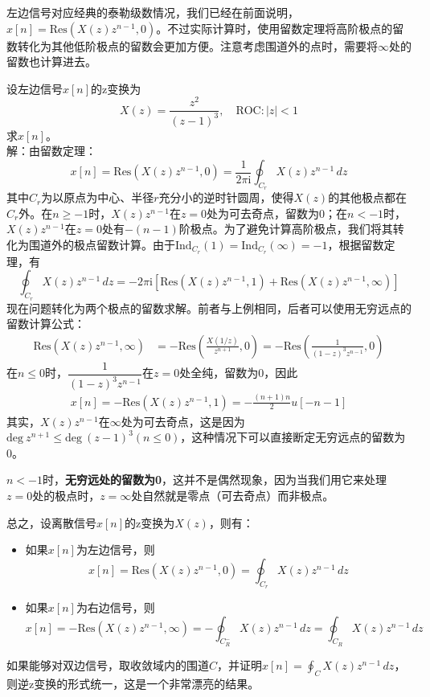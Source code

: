 左边信号对应经典的泰勒级数情况，我们已经在前面说明，$x[n]=\mathrm{Res}\left(X(z)z^{n-1},0\right)$。不过实际计算时，使用留数定理将高阶极点的留数转化为其他低阶极点的留数会更加方便。注意考虑围道外的点时，需要将$\infty$处的留数也计算进去。
\begin{example}
    设左边信号$x[n]$的z变换为
    \[X(z)=\frac{z^2}{(z-1)^3},\quad \mathrm{ROC}:|z|<1\]
    求$x[n]$。\\
    解：由留数定理：
    \[x[n]=\mathrm{Res}\left(X(z)z^{n-1},0\right)=\frac{1}{2\pi \mathrm{i}}\oint_{C_r}X(z)z^{n-1}\,dz\]
    其中$C_r$为以原点为中心、半径$r$充分小的逆时针圆周，使得$X(z)$的其他极点都在$C_r$外。在$n\geq -1$时，$X(z)z^{n-1}$在$z=0$处为可去奇点，留数为0；在$n<-1$时，$X(z)z^{n-1}$在$z=0$处有$-(n-1)$阶极点。为了避免计算高阶极点，我们将其转化为围道外的极点留数计算。由于$\mathrm{Ind}_{C_r}(1)=\mathrm{Ind}_{C_r}(\infty)=-1$，根据留数定理，有
    \[\oint_{C_r}X(z)z^{n-1}\,dz=-2\pi \mathrm{i} \left[\mathrm{Res}\left(X(z)z^{n-1},1\right)+\mathrm{Res}\left(X(z)z^{n-1},\infty\right)\right]\]
    现在问题转化为两个极点的留数求解。前者与上例相同，后者可以使用无穷远点的留数计算公式：
    \begin{align*}
        \mathrm{Res}\left(X(z)z^{n-1},\infty\right)&=-\mathrm{Res}\left(\frac{X(1/z)}{z^{n+1}},0\right)=-\mathrm{Res}\left(\frac{1}{(1-z)^3 z^{n-1}},0\right)
    \end{align*}
    在$n\le 0$时，$\dfrac{1}{(1-z)^3 z^{n-1}}$在$z=0$处全纯，留数为0，因此
    \begin{align*}
        x[n]=-\mathrm{Res}\left(X(z)z^{n-1},1\right)=-\frac{(n+1)n}{2}u[-n-1]
    \end{align*}
    其实，$X(z)z^{n-1}$在$\infty$处为可去奇点，这是因为$\mathrm{deg}\ z^{n+1}\leq \mathrm{deg}\ (z-1)^3(n\le 0)$，这种情况下可以直接断定无穷远点的留数为0。
\end{example}

$n<-1$时，\textbf{无穷远处的留数为0}，这并不是偶然现象，因为当我们用它来处理$z=0$处的极点时，$z=\infty$处自然就是零点（可去奇点）而非极点。

总之，设离散信号$x[n]$的z变换为$X(z)$，则有：
\begin{itemize}
    \item 如果$x[n]$为左边信号，则
    \[x[n]=\mathrm{Res}\left(X(z)z^{n-1},0\right)=\oint_{C_r}X(z)z^{n-1}\,dz\]
    \item 如果$x[n]$为右边信号，则
    \[x[n]=-\mathrm{Res}\left(X(z)z^{n-1},\infty\right)=-\oint_{C^-_R}X(z)z^{n-1}\,dz=\oint_{C_R}X(z)z^{n-1}\,dz\]
\end{itemize}
如果能够对双边信号，取收敛域内的围道$C$，并证明$x[n]=\oint_{C}X(z)z^{n-1}\,dz$，则逆z变换的形式统一，这是一个非常漂亮的结果。


